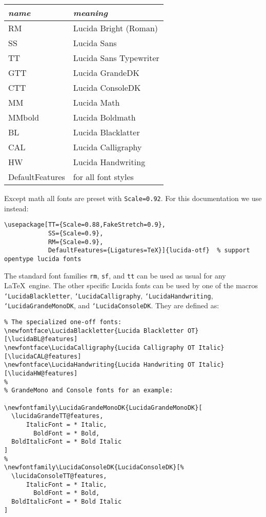 \documentclass[11pt]{article}
\DeclareRobustCommand\cs[1]{\mbox{\texttt{\char`\\#1}}}
\begin{document}
\begin{tabular}{@{} >{\ttfamily}l l @{}}\\\toprule
\emph{name} & \emph{meaning}\\\midrule
RM & Lucida Bright (Roman)\\
SS & Lucida Sans\\
TT & Lucida Sans Typewriter\\
GTT & Lucida GrandeDK\\
CTT & Lucida ConsoleDK \\
MM & Lucida Math\\
MMbold & Lucida Boldmath\\
BL & Lucida Blacklatter\\
CAL & Lucida Calligraphy\\
HW & Lucida Handwriting\\
DefaultFeatures & for all font styles\\\bottomrule
\end{tabular}

\bigskip
Except math all fonts are preset with \texttt{Scale=0.92}. For this documentation
we use instead:

\begin{verbatim}
\usepackage[TT={Scale=0.88,FakeStretch=0.9},
            SS={Scale=0.9},
            RM={Scale=0.9},
            DefaultFeatures={Ligatures=TeX}]{lucida-otf}  % support opentype lucida fonts
\end{verbatim}

\begin{sloppypar}
The standard font families \texttt{rm}, \texttt{sf}, and \texttt{tt} 
can be used as usual for any \LaTeX\  engine. The other specific Lucida fonts
can be used by one of the macros \cs{LucidaBlackletter}, 
\cs{LucidaCalligraphy}, 
\cs{LucidaHandwriting},
\cs{LucidaGrandeMonoDK}, and
\cs{LucidaConsoleDK}. They are defined as:
\end{sloppypar}





\begin{verbatim}
% The specialized one-off fonts:
\newfontface\LucidaBlackletter{Lucida Blackletter OT}[\lucidaBL@features]
\newfontface\LucidaCalligraphy{Lucida Calligraphy OT Italic}[\lucidaCAL@features]
\newfontface\LucidaHandwriting{Lucida Handwriting OT Italic}[\lucidaHW@features]
%
% GrandeMono and Console fonts for an example:

\newfontfamily\LucidaGrandeMonoDK{LucidaGrandeMonoDK}[
  \lucidaGrandeTT@features,
      ItalicFont = * Italic,
        BoldFont = * Bold,
  BoldItalicFont = * Bold Italic
]
%
\newfontfamily\LucidaConsoleDK{LucidaConsoleDK}[%
  \lucidaConsoleTT@features,
      ItalicFont = * Italic,
        BoldFont = * Bold,
  BoldItalicFont = * Bold Italic
]
\end{verbatim}
\end{document}
